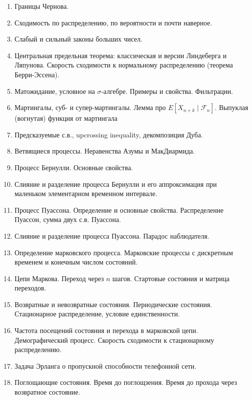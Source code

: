 \documentclass[12pt]{article}
\newcommand\F{\mathcal{F}}
\begin{document}
\begin{enumerate}
  \item Границы Чернова. 
  \item Сходимость по распределению, по вероятности и почти наверное.
  \item Слабый и сильный законы больших чисел.
  \item Центральная предельная теорема: классическая и версии Линдеберга и Ляпунова. Скорость сходимости к нормальному распределению (теорема Берри-Эссена).
  \item Матожидание, условное на $\sigma$-алгебре. Примеры и свойства. Фильтрации.
  \item Мартингалы, суб- и супер-мартингалы. Лемма про $E[X_{n + k} \mid \F_n]$. Выпуклая (вогнутая) функция от мартингала
  \item Предсказуемые с.в., upcrossing inequality, декомпозиция Дуба.
  \item Ветвящиеся процессы. Неравенства Азумы и МакДиармида.
  \item Процесс Бернулли. Основные свойства.
  \item Слияние и разделение процесса Бернулли и его аппроксимация при маленьком элементарном временном интервале.
  \item Процесс Пуассона. Определение и основные свойства. Распределение Пуассон, сумма двух с.в. Пуассона.
  \item Слияние и разделение процесса Пуассона. Парадос наблюдателя.
  \item Определение марковского процесса. Марковские процессы с дискретным временем и конечным числом состояний.
  \item Цепи Маркова. Переход через $n$ шагов. Стартовые состояния и матрица переходов.
  \item Возвратные и невозвратные состояния. Периодические состояния. Стационарное распределение, условие единственности. 
  \item Частота посещений состояния и перехода в марковской цепи. Демографический процесс. Скорость сходимости к стационарному распределению.
  \item Задача Эрланга о пропускной способности телефонной сети.
  \item Поглощающие состояния. Время до поглощзения. Время до прохода через возвратное состояние.
\end{enumerate}
\end{document}
